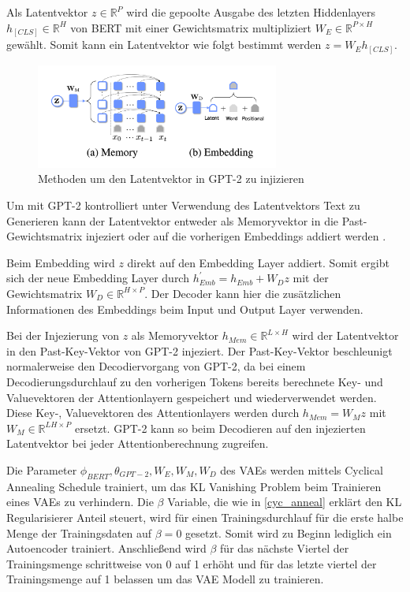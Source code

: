 Als Latentvektor $z \in \mathbb{R}^P$ wird die gepoolte Ausgabe des letzten Hiddenlayers $h_{[CLS]} \in \mathbb{R}^H$ von BERT mit einer Gewichtsmatrix multipliziert $W_{E} \in \mathbb{R}^{P\times H}$ gewählt. Somit kann ein Latentvektor wie folgt bestimmt werden $z = W_{E}h_{[CLS]}$.

\begin{figure}[h]
    \centering
    \includegraphics[width=8cm]{bilder/latent_optimus}
    \caption{Methoden um den Latentvektor in GPT-2 zu injizieren \citep{DBLP:journals/corr/abs-2004-04092}}
    \label{latent_optimus}
\end{figure}

Um mit GPT-2 kontrolliert unter Verwendung des Latentvektors Text zu Generieren kann der Latentvektor entweder als Memoryvektor in die Past-Gewichtsmatrix injeziert oder auf die vorherigen Embeddings addiert werden \citep{DBLP:journals/corr/abs-2004-04092}.

Beim Embedding wird $z$ direkt auf den Embedding Layer addiert. Somit ergibt sich der neue Embedding Layer durch $h_{Emb}^{'} = h_{Emb} + W_D z$ mit der Gewichtsmatrix $W_D \in \mathbb{R}^{H \times P}$.
Der Decoder kann hier die zusätzlichen Informationen des Embeddings beim Input und Output Layer verwenden.

Bei der Injezierung von $z$ als Memoryvektor $h_{Mem} \in \mathbb{R}^{L\times H}$ wird der Latentvektor in den Past-Key-Vektor von GPT-2 injeziert. 
Der Past-Key-Vektor beschleunigt normalerweise den Decodiervorgang von GPT-2, da bei einem Decodierungsdurchlauf zu den vorherigen Tokens bereits berechnete Key- und Valuevektoren der Attentionlayern gespeichert und wiederverwendet werden.
Diese Key-, Valuevektoren des Attentionlayers werden durch $h_{Mem} = W_M z$ mit $W_M \in \mathbb{R}^{LH \times P}$ ersetzt. GPT-2 kann so beim Decodieren auf den injezierten Latentvektor bei jeder Attentionberechnung zugreifen.

Die Parameter ${\phi_{BERT}, \theta_{GPT-2}, W_E,W_M,W_D}$ des VAEs werden mittels Cyclical Annealing Schedule \citep{cyc_anneal} trainiert, um das KL Vanishing Problem beim Trainieren eines VAEs zu verhindern.
Die $\beta$ Variable, die wie in \ref{cyc_anneal} erklärt den KL Regularisierer Anteil steuert, wird für einen Trainingsdurchlauf für die erste halbe Menge der Trainingsdaten auf $\beta = 0$ gesetzt. Somit wird zu Beginn lediglich ein Autoencoder trainiert. 
Anschließend wird $\beta$ für das nächste Viertel der Trainingsmenge schrittweise von 0 auf 1 erhöht und für das letzte viertel der Trainingsmenge auf 1 belassen um das VAE Modell zu trainieren.

